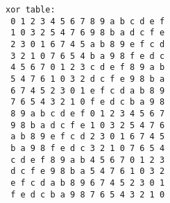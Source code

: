 \begin{sourceslandscape}



\begin{verbatim}
xor table:
 0 1 2 3 4 5 6 7 8 9 a b c d e f
 1 0 3 2 5 4 7 6 9 8 b a d c f e
 2 3 0 1 6 7 4 5 a b 8 9 e f c d
 3 2 1 0 7 6 5 4 b a 9 8 f e d c
 4 5 6 7 0 1 2 3 c d e f 8 9 a b
 5 4 7 6 1 0 3 2 d c f e 9 8 b a
 6 7 4 5 2 3 0 1 e f c d a b 8 9
 7 6 5 4 3 2 1 0 f e d c b a 9 8
 8 9 a b c d e f 0 1 2 3 4 5 6 7
 9 8 b a d c f e 1 0 3 2 5 4 7 6
 a b 8 9 e f c d 2 3 0 1 6 7 4 5
 b a 9 8 f e d c 3 2 1 0 7 6 5 4
 c d e f 8 9 a b 4 5 6 7 0 1 2 3
 d c f e 9 8 b a 5 4 7 6 1 0 3 2
 e f c d a b 8 9 6 7 4 5 2 3 0 1
 f e d c b a 9 8 7 6 5 4 3 2 1 0
\end{verbatim}
\end{sourceslandscape}
